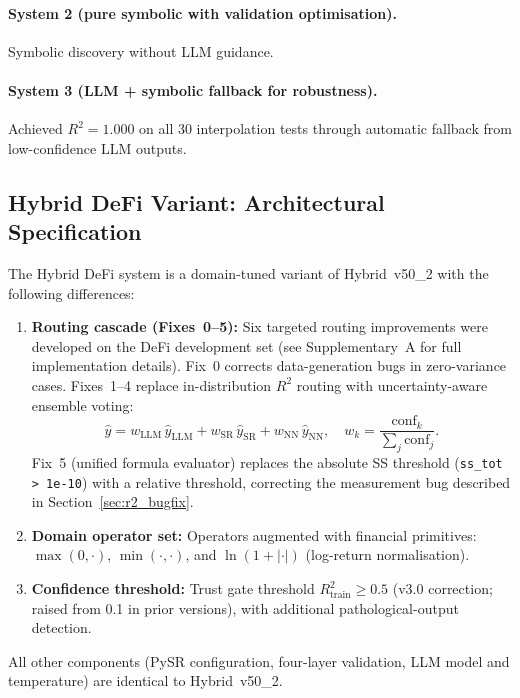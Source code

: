 \documentclass[twoside,11pt]{article}
\begin{document}
\paragraph{System 2 (pure symbolic with validation optimisation).}
Symbolic discovery without LLM guidance.

\paragraph{System 3 (LLM + symbolic fallback for robustness).}
Achieved $R^2 = 1.000$ on all 30 interpolation tests through automatic
fallback from low-confidence LLM outputs.

\subsection{Hybrid DeFi Variant: Architectural Specification}\label{subsec:hybrid-defi-variant-architectural-specif}
\label{sec:hybrid_defi_spec}

The Hybrid DeFi system is a domain-tuned variant of Hybrid~v50\_2 with the
following differences:

\begin{enumerate}
\item \textbf{Routing cascade (Fixes~0--5):} Six targeted routing improvements
  were developed on the DeFi development set (see Supplementary~A for full
  implementation details).  Fix~0 corrects data-generation bugs in zero-variance
  cases.  Fixes~1--4 replace in-distribution $R^2$ routing with uncertainty-aware
  ensemble voting:
  \[
    \hat{y} = w_\mathrm{LLM}\,\hat{y}_\mathrm{LLM}
             + w_\mathrm{SR}\,\hat{y}_\mathrm{SR}
             + w_\mathrm{NN}\,\hat{y}_\mathrm{NN},
    \quad w_k = \frac{\mathrm{conf}_k}{\sum_j \mathrm{conf}_j}.
  \]
  Fix~5 (unified formula evaluator) replaces the absolute SS threshold
  (\texttt{ss\_tot > 1e-10}) with a relative threshold, correcting the
  measurement bug described in Section~\ref{sec:r2_bugfix}.
\item \textbf{Domain operator set:} Operators augmented with financial
  primitives: $\max(0,\cdot)$, $\min(\cdot,\cdot)$, and
  $\ln(1+|\cdot|)$ (log-return normalisation).
\item \textbf{Confidence threshold:} Trust gate threshold $R^2_{\mathrm{train}} \geq 0.5$
  (v3.0 correction; raised from 0.1 in prior versions), with additional
  pathological-output detection.
\end{enumerate}

All other components (PySR configuration, four-layer validation, LLM model and
temperature) are identical to Hybrid~v50\_2.
\end{document}
